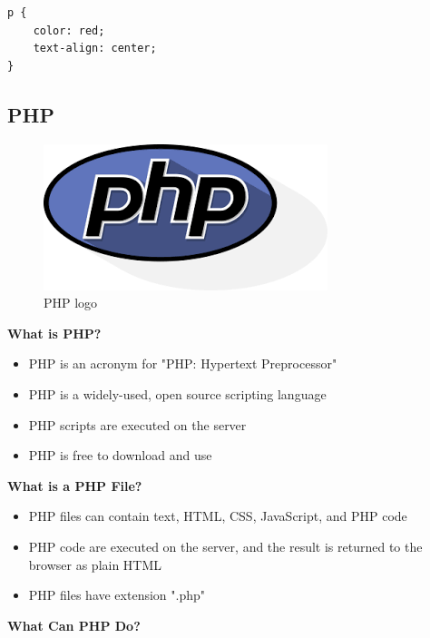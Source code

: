 \begin{verbatim}
p {
    color: red;
    text-align: center;
} 
\end{verbatim}
\subsection{PHP}
\begin{figure}[h!]
\centering \includegraphics[scale=0.50]{input/images/php.png}
\caption{PHP logo}
\end{figure}
 {\bf What is PHP?}
\begin{itemize}
   \item  PHP is an acronym for "PHP: Hypertext Preprocessor"
    \item PHP is a widely-used, open source scripting language
     \item PHP scripts are executed on the server
     \item  PHP is free to download and use\\
\end{itemize}
 {\bf What is a PHP File?}
\begin{itemize}
     \item PHP files can contain text, HTML, CSS, JavaScript, and PHP code
    \item PHP code are executed on the server, and the result is returned to the browser as plain HTML
    \item  PHP files have extension ".php"\\
\end{itemize}
 {\bf What Can PHP Do?}

